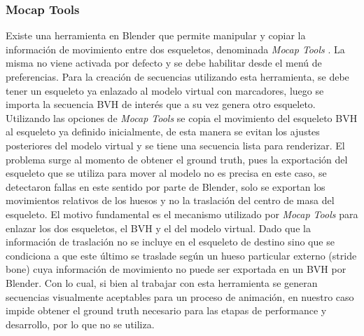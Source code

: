 \subsubsection*{Mocap Tools}

Existe una herramienta en Blender que permite manipular y copiar la información de movimiento entre dos esqueletos, denominada \textit{Mocap Tools} . La misma no viene activada por defecto y se debe habilitar desde el menú de preferencias. Para la creación de secuencias utilizando esta herramienta, se debe tener un esqueleto ya enlazado al modelo virtual con marcadores, luego se importa la secuencia BVH de interés que a su vez genera otro esqueleto. Utilizando las opciones de \textit{Mocap Tools}  se copia el movimiento del esqueleto BVH al esqueleto ya definido inicialmente, de esta manera se evitan los ajustes posteriores del modelo virtual y se tiene una secuencia lista para renderizar. 
El problema surge al momento de obtener el ground truth, pues la exportación del esqueleto que se utiliza para mover al modelo no es precisa en este caso, se detectaron fallas en este sentido por parte de Blender, solo se exportan los movimientos relativos de los huesos y no la traslación del centro de masa del esqueleto. El motivo fundamental es el mecanismo utilizado por \textit{Mocap Tools} para enlazar los dos esqueletos, el BVH y el del modelo virtual. Dado que la información de traslación no se incluye en el esqueleto de destino sino que se condiciona a que este último se traslade según un hueso particular externo (\textsf{stride bone})  cuya información de movimiento no puede ser exportada en un BVH por Blender. Con lo cual, si bien al trabajar con esta herramienta se generan secuencias visualmente aceptables para un proceso de animación, en nuestro caso impide obtener el ground truth necesario para las etapas de performance y desarrollo, por lo que no se utiliza.
 
    






